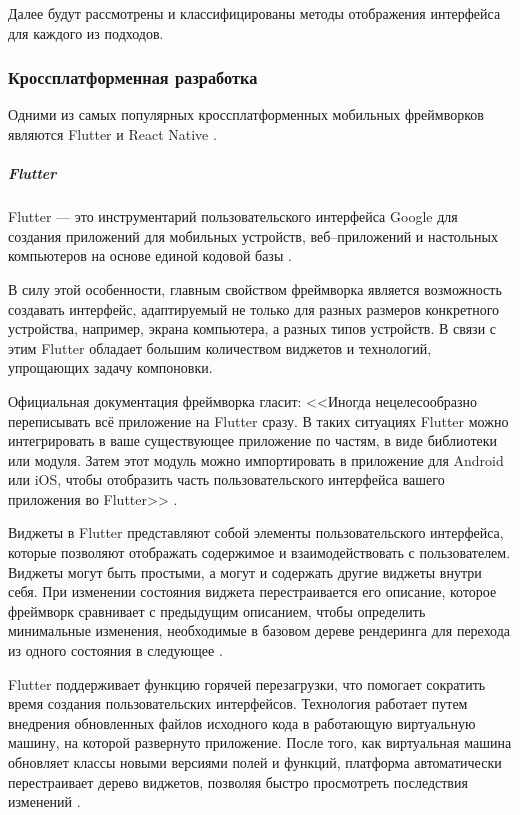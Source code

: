 Далее будут рассмотрены и классифицированы методы отображения интерфейса для каждого из подходов.

\subsubsection{Кроссплатформенная разработка} 

Одними из самых популярных кроссплатформенных мобильных фреймворков являются Flutter и React Native \cite{crossplatform-stat}.

\subparagraph{Flutter}   
\subparagraph{}  

Flutter --- это инструментарий пользовательского интерфейса Google для создания приложений для мобильных устройств, веб--приложений и настольных компьютеров на основе единой кодовой базы \cite{flutter}. 

В силу этой особенности, главным свойством фреймворка является возможность создавать интерфейс, адаптируемый не только для разных размеров конкретного устройства, например, экрана компьютера, а разных типов устройств. 
В связи с этим Flutter обладает большим количеством виджетов и технологий, упрощающих задачу компоновки. 

Официальная документация фреймворка гласит: <<Иногда нецелесообразно переписывать всё приложение на Flutter сразу. 
В таких ситуациях Flutter можно интегрировать в ваше существующее приложение по частям, в виде библиотеки или модуля. 
Затем этот модуль можно импортировать в приложение для Android или iOS, чтобы отобразить часть пользовательского интерфейса вашего приложения во Flutter>> \cite{flutter-integr}.

Виджеты в Flutter представляют собой элементы пользовательского интерфейса, которые позволяют отображать содержимое и взаимодействовать с пользователем. 
Виджеты могут быть простыми, а могут и содержать другие виджеты внутри себя. 
При изменении состояния виджета перестраивается его описание, которое фреймворк сравнивает с предыдущим описанием, чтобы определить минимальные изменения, необходимые в базовом дереве рендеринга для перехода из одного состояния в следующее \cite{flutter-ui}.

Flutter поддерживает функцию горячей перезагрузки, что помогает сократить время создания пользовательских интерфейсов.
Технология работает путем внедрения обновленных файлов исходного кода в работающую виртуальную машину, на которой развернуто приложение. 
После того, как виртуальная машина обновляет классы новыми версиями полей и функций, платформа автоматически перестраивает дерево виджетов, позволяя быстро просмотреть последствия изменений \cite{flutter-hot-reload}.

